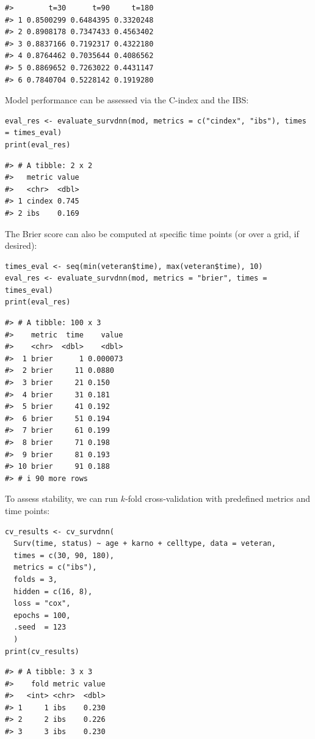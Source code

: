 \begin{verbatim}
#>        t=30      t=90     t=180
#> 1 0.8500299 0.6484395 0.3320248
#> 2 0.8908178 0.7347433 0.4563402
#> 3 0.8837166 0.7192317 0.4322180
#> 4 0.8764462 0.7035644 0.4086562
#> 5 0.8869652 0.7263022 0.4431147
#> 6 0.7840704 0.5228142 0.1919280
\end{verbatim}

Model performance can be assessed via the C-index and the IBS:

\begin{verbatim}
eval_res <- evaluate_survdnn(mod, metrics = c("cindex", "ibs"), times = times_eval)
print(eval_res)
\end{verbatim}

\begin{verbatim}
#> # A tibble: 2 x 2
#>   metric value
#>   <chr>  <dbl>
#> 1 cindex 0.745
#> 2 ibs    0.169
\end{verbatim}

The Brier score can also be computed at specific time points (or over a grid, if desired):

\begin{verbatim}
times_eval <- seq(min(veteran$time), max(veteran$time), 10)
eval_res <- evaluate_survdnn(mod, metrics = "brier", times = times_eval)
print(eval_res)
\end{verbatim}

\begin{verbatim}
#> # A tibble: 100 x 3
#>    metric  time    value
#>    <chr>  <dbl>    <dbl>
#>  1 brier      1 0.000073
#>  2 brier     11 0.0880  
#>  3 brier     21 0.150   
#>  4 brier     31 0.181   
#>  5 brier     41 0.192   
#>  6 brier     51 0.194   
#>  7 brier     61 0.199   
#>  8 brier     71 0.198   
#>  9 brier     81 0.193   
#> 10 brier     91 0.188   
#> # i 90 more rows
\end{verbatim}

To assess stability, we can run \(k\)‑fold cross‑validation with predefined metrics and time points:

\begin{verbatim}
cv_results <- cv_survdnn(
  Surv(time, status) ~ age + karno + celltype, data = veteran,
  times = c(30, 90, 180),
  metrics = c("ibs"),
  folds = 3,
  hidden = c(16, 8),
  loss = "cox",
  epochs = 100,
  .seed  = 123
  )
print(cv_results)
\end{verbatim}

\begin{verbatim}
#> # A tibble: 3 x 3
#>    fold metric value
#>   <int> <chr>  <dbl>
#> 1     1 ibs    0.230
#> 2     2 ibs    0.226
#> 3     3 ibs    0.230
\end{verbatim}

